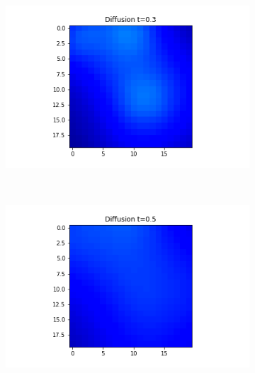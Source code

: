 \documentclass[10pt,a4paper]{article}
\begin{document}
\begin{enumerate}[i)]
\begin{enumerate}[a)]
\begin{figure}[!h]
\begin{subfigure}[b]{0.25\textwidth}
    				\includegraphics[width= \textwidth]{images/mellin-x2-t3.png}
    			\end{subfigure}~
    			\begin{subfigure}[b]{0.25\textwidth}
    				\includegraphics[width= \textwidth]{images/mellin-x2-t5.png}
    			\end{subfigure}
    			\caption{}
    		\end{figure}
    		\begin{figure}[!h]
    			\centering
    			\begin{subfigure}[b]{0.25\textwidth}

\end{subfigure}
\end{figure}
\end{enumerate}
\end{enumerate}
\end{document}
